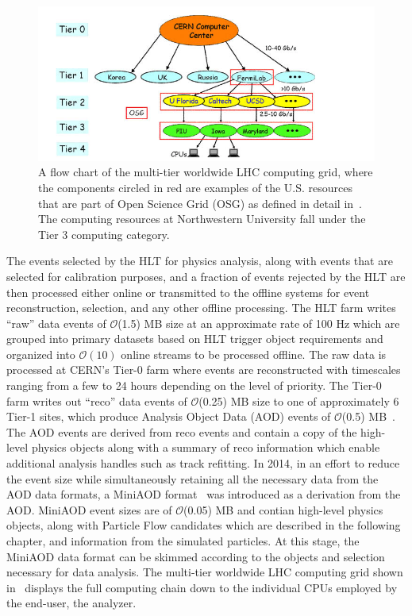\begin{figure}
  \centering
  \includegraphics[width=\textwidth]{figs/computing}
  \caption{A flow chart of the multi-tier worldwide LHC computing grid, where the components circled in red are examples of the U.S. resources that are part of Open Science Grid (OSG) as defined in detail in~\cite{FM1866}. The computing resources at Northwestern University fall under the Tier 3 computing category.}
\label{fig:computing}
\end{figure}

The events selected by the HLT for physics analysis, along with events that are selected for calibration purposes, and a fraction of events rejected by the HLT are then processed either online or transmitted to the offline systems for event reconstruction, selection, and any other offline processing. The HLT farm writes ``raw'' data events of $\mathcal{O}$(1.5) MB size at an approximate rate of 100 Hz which are grouped into primary datasets based on HLT trigger object requirements and organized into $\mathcal{O}(10)$ online streams to be processed offline. The raw data is processed at CERN's Tier-0 farm where events are reconstructed with timescales ranging from a few to 24 hours depending on the level of priority. The Tier-0 farm writes out ``reco'' data events of $\mathcal{O}$(0.25) MB size to one of approximately 6 Tier-1 sites, which produce Analysis Object Data (AOD) events of $\mathcal{O}$(0.5) MB~\cite{Eck:840543}. The AOD events are derived from reco events and contain a copy of the high-level physics objects along with a summary of reco information which enable additional analysis handles such as track refitting. In 2014, in an effort to reduce the event size while simultaneously retaining all the necessary data from the AOD data formats, a MiniAOD format~\cite{1742-6596-664-7-072052} was introduced as a derivation from the AOD. MiniAOD event sizes are of $\mathcal{O}$(0.05) MB and contian high-level physics objects, along with Particle Flow candidates which are described in the following chapter, and information from the simulated particles. At this stage, the MiniAOD data format can be skimmed according to the objects and selection necessary for data analysis. The multi-tier worldwide LHC computing grid shown in~ displays the full computing chain down to the individual CPUs employed by the end-user, the analyzer.

